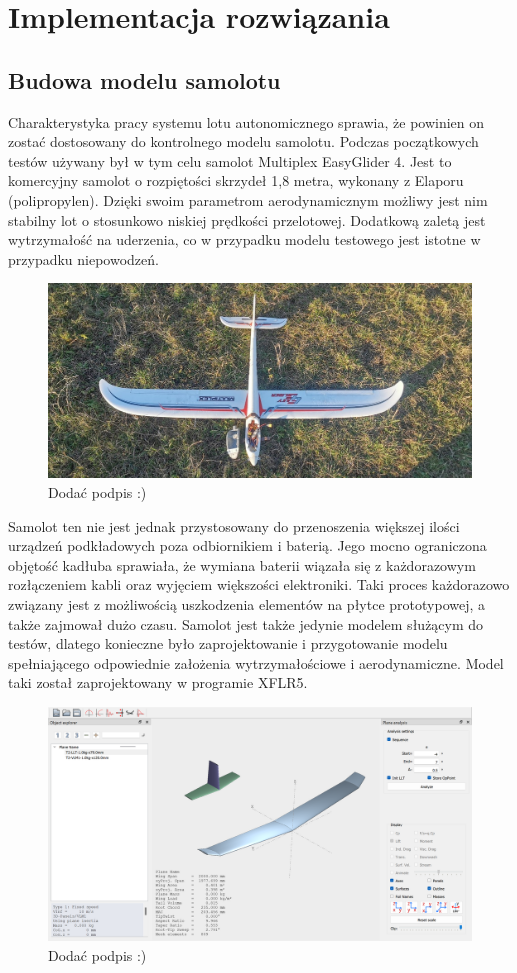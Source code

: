 \documentclass[12pt, a4paper]{article}
\begin{document}
\section{Implementacja rozwiązania}
\subsection{Budowa modelu samolotu}
Charakterystyka pracy systemu lotu autonomicznego sprawia, że powinien  on zostać dostosowany do kontrolnego modelu samolotu. Podczas początkowych testów używany był w tym celu samolot Multiplex EasyGlider 4. Jest to komercyjny samolot o rozpiętości skrzydeł 1,8 metra, wykonany z Elaporu (polipropylen). Dzięki swoim parametrom aerodynamicznym możliwy jest nim stabilny lot o stosunkowo niskiej prędkości przelotowej. Dodatkową zaletą jest wytrzymałość na uderzenia, co w przypadku modelu testowego jest istotne w przypadku niepowodzeń.
\begin{figure}[ht]
    \centering
    \includegraphics[width=1\textwidth]{budowa1}
    \caption{Dodać podpis :)}
\end{figure}
Samolot ten nie jest jednak przystosowany do przenoszenia większej ilości urządzeń podkładowych poza odbiornikiem i baterią. Jego mocno ograniczona objętość kadłuba sprawiała, że wymiana baterii wiązała się z każdorazowym rozłączeniem kabli oraz wyjęciem większości elektroniki. Taki proces każdorazowo związany jest z możliwością uszkodzenia elementów na płytce prototypowej, a także zajmował dużo czasu. Samolot jest także jedynie modelem służącym do testów, dlatego konieczne było zaprojektowanie i przygotowanie modelu spełniającego odpowiednie założenia wytrzymałościowe i aerodynamiczne. Model taki został zaprojektowany w programie XFLR5.
 \begin{figure}[ht]
    \centering
    \includegraphics[width=1\textwidth]{xflr}
    \caption{Dodać podpis :)}
\end{figure}
\end{document}

